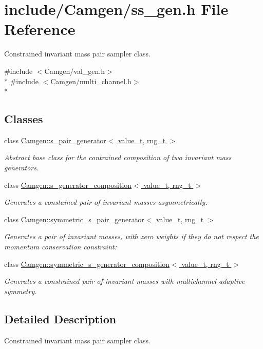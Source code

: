 \hypertarget{a00785}{}\section{include/\+Camgen/ss\+\_\+gen.h File Reference}
\label{a00785}


Constrained invariant mass pair sampler class.  


{\ttfamily \#include $<$Camgen/val\+\_\+gen.\+h$>$}\\*
{\ttfamily \#include $<$Camgen/multi\+\_\+channel.\+h$>$}\\*
\subsection*{Classes}
\begin{DoxyCompactItemize}
\item 
class \hyperlink{a00495}{Camgen\+::s\+\_\+pair\+\_\+generator$<$ value\+\_\+t, rng\+\_\+t $>$}
\begin{DoxyCompactList}\small\item\em Abstract base class for the contrained composition of two invariant mass generators. \end{DoxyCompactList}\item 
class \hyperlink{a00493}{Camgen\+::s\+\_\+generator\+\_\+composition$<$ value\+\_\+t, rng\+\_\+t $>$}
\begin{DoxyCompactList}\small\item\em Generates a constained pair of invariant masses asymmetrically. \end{DoxyCompactList}\item 
class \hyperlink{a00534}{Camgen\+::symmetric\+\_\+s\+\_\+pair\+\_\+generator$<$ value\+\_\+t, rng\+\_\+t $>$}
\begin{DoxyCompactList}\small\item\em Generates a pair of invariant masses, with zero weights if they do not respect the momentum conservation constraint\+: \end{DoxyCompactList}\item 
class \hyperlink{a00533}{Camgen\+::symmetric\+\_\+s\+\_\+generator\+\_\+composition$<$ value\+\_\+t, rng\+\_\+t $>$}
\begin{DoxyCompactList}\small\item\em Generates a constrained pair of invariant masses with multichannel adaptive symmetry. \end{DoxyCompactList}\end{DoxyCompactItemize}


\subsection{Detailed Description}
Constrained invariant mass pair sampler class. 

